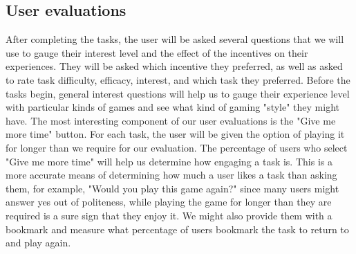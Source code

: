 \subsection{User evaluations}
After completing the tasks, the user will be asked several questions that we will use to gauge their interest level and the effect of the incentives on their experiences. They will be asked which incentive they preferred, as well as asked to rate task difficulty, efficacy, interest, and which task they preferred. Before the tasks begin, general interest questions will help us to gauge their experience level with particular kinds of games and see what kind of gaming "style" they might have. The most interesting component of our user evaluations is the "Give me more time" button. For each task, the user will be given the option of playing it for longer than we require for our evaluation. The percentage of users who select "Give me more time" will help us determine how engaging a task is. This is a more accurate means of determining how much a user likes a task than asking them, for example, "Would you play this game again?" since many users might answer yes out of politeness, while playing the game for longer than they are required is a sure sign that they enjoy it. We might also provide them with a bookmark and measure what percentage of users bookmark the task to return to and play again.